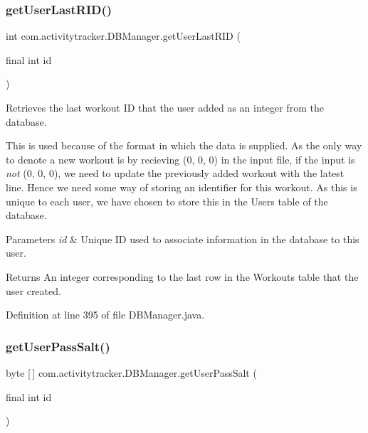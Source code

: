 \subsubsection{\texorpdfstring{get\+User\+Last\+R\+I\+D()}{getUserLastRID()}}
{\footnotesize\ttfamily int com.\+activitytracker.\+D\+B\+Manager.\+get\+User\+Last\+R\+ID (\begin{DoxyParamCaption}\item[{final int}]{id }\end{DoxyParamCaption})}

Retrieves the last workout ID that the user added as an integer from the database.

This is used because of the format in which the data is supplied. As the only way to denote a new workout is by recieving (0, 0, 0) in the input file, if the input is {\itshape not} (0, 0, 0), we need to update the previously added workout with the latest line. Hence we need some way of storing an identifier for this workout. As this is unique to each user, we have chosen to store this in the Users table of the database.


\begin{DoxyParams}{Parameters}
{\em id} & Unique ID used to associate information in the database to this user. \\
\hline
\end{DoxyParams}
\begin{DoxyReturn}{Returns}
An integer corresponding to the last row in the Workouts table that the user created. 
\end{DoxyReturn}


Definition at line 395 of file D\+B\+Manager.\+java.

\mbox{\label{classcom_1_1activitytracker_1_1_d_b_manager_aeab864b072cc08c0521e80ae1f459ca7}} 
\subsubsection{\texorpdfstring{get\+User\+Pass\+Salt()}{getUserPassSalt()}}
{\footnotesize\ttfamily byte \mbox{[}$\,$\mbox{]} com.\+activitytracker.\+D\+B\+Manager.\+get\+User\+Pass\+Salt (\begin{DoxyParamCaption}\item[{final int}]{id }\end{DoxyParamCaption})}

